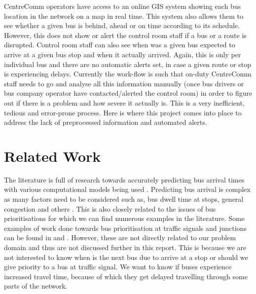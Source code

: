 CentreComm operators have access to an online GIS system showing each bus location in the network on a map in real time. This system also allows them to see whether a given bus is behind, ahead or on time according to its schedule. However, this does not show or alert the control room staff if a bus or a route is disrupted. Control room staff can also see when was a given bus expected to arrive at a given bus stop and when it actually arrived. Again, this is only per individual bus and there are no automatic alerts set, in case a given route or stop is experiencing delays. Currently the work-flow is such that on-duty CentreComm staff needs to go and analyse all this information manually (once bus drivers or bus company operator have contacted/alerted the control room) in order to figure out if there is a problem and how severe it actually is. This is a very inefficient, tedious and error-prone process. Here is where this project comes into place to address the lack of preprocessed information and automated alerts.

\section{Related Work}
The literature is full of research towards accurately predicting bus arrival times with various computational models being used \cite{altinkaya2013urban}. Predicting bus arrival is complex as many factors need to be considered such as, bus dwell time at stops, general congestion and others \cite{jeong2005prediction}. This is also closely related to the issues of bus prioritisations for which we can find numerous examples in the literature. Some examples of work done towards bus prioritisation at traffic signals and junctions can be found in \cite{eps52676} and \cite{clarke2007}. However, these are not directly related to our problem domain and thus are not discussed further in this report. This is because we are not interested to know when is the next bus due to arrive at a stop or should we give priority to a bus at traffic signal. We want to know if buses experience increased travel time, because of which they get delayed travelling through some parts of the network. 
 
 

